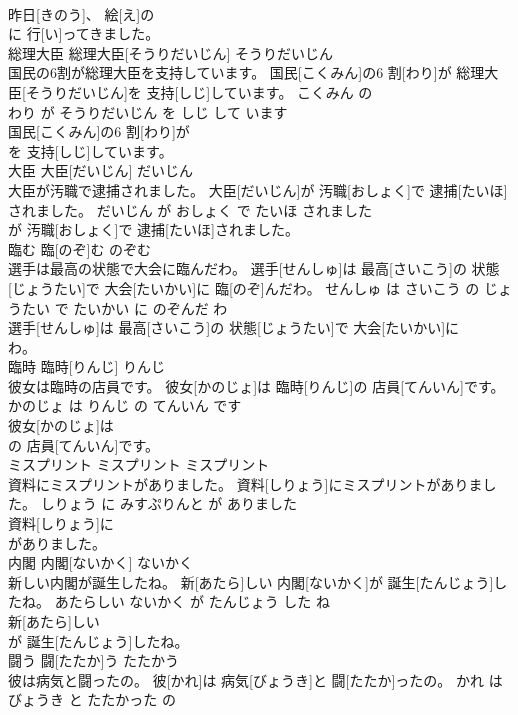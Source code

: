 \documentclass[8pt]{extreport}
\begin{document}
\begin{CJK}{UTF8}{min}
\\	昨日[きのう]、 絵[え]の
\\	に 行[い]ってきました。			
\\	総理大臣	総理大臣[そうりだいじん]	そうりだいじん	
\\	国民の6割が総理大臣を支持しています。	国民[こくみん]の6 割[わり]が 総理大臣[そうりだいじん]を 支持[しじ]しています。	こくみん の 
\\	わり が そうりだいじん を しじ して います	
\\	国民[こくみん]の6 割[わり]が
\\	を 支持[しじ]しています。			
\\	大臣	大臣[だいじん]	だいじん	
\\	大臣が汚職で逮捕されました。	大臣[だいじん]が 汚職[おしょく]で 逮捕[たいほ]されました。	だいじん が おしょく で たいほ されました	
\\	が 汚職[おしょく]で 逮捕[たいほ]されました。			
\\	臨む	臨[のぞ]む	のぞむ	
\\	選手は最高の状態で大会に臨んだわ。	選手[せんしゅ]は 最高[さいこう]の 状態[じょうたい]で 大会[たいかい]に 臨[のぞ]んだわ。	せんしゅ は さいこう の じょうたい で たいかい に のぞんだ わ	
\\	選手[せんしゅ]は 最高[さいこう]の 状態[じょうたい]で 大会[たいかい]に
\\	わ。			
\\	臨時	臨時[りんじ]	りんじ	
\\	彼女は臨時の店員です。	彼女[かのじょ]は 臨時[りんじ]の 店員[てんいん]です。	かのじょ は りんじ の てんいん です	
\\	彼女[かのじょ]は
\\	の 店員[てんいん]です。			
\\	ミスプリント	ミスプリント	ミスプリント	
\\	資料にミスプリントがありました。	資料[しりょう]にミスプリントがありました。	しりょう に みすぷりんと が ありました	
\\	資料[しりょう]に
\\	がありました。			
\\	内閣	内閣[ないかく]	ないかく	
\\	新しい内閣が誕生したね。	新[あたら]しい 内閣[ないかく]が 誕生[たんじょう]したね。	あたらしい ないかく が たんじょう した ね	
\\	新[あたら]しい
\\	が 誕生[たんじょう]したね。			
\\	闘う	闘[たたか]う	たたかう	
\\	彼は病気と闘ったの。	彼[かれ]は 病気[びょうき]と 闘[たたか]ったの。	かれ は びょうき と たたかった の	

\end{CJK}
\end{document}
